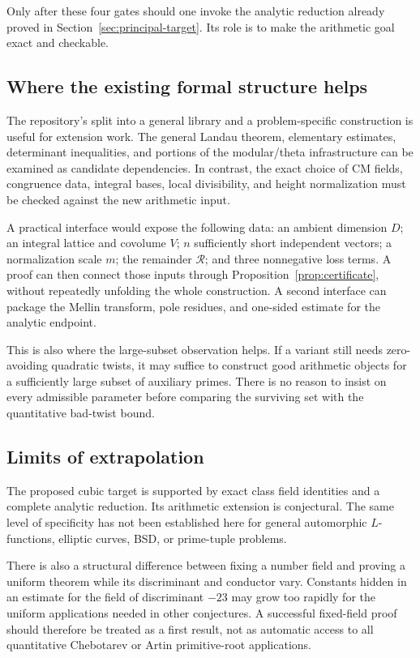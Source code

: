 Only after these four gates should one invoke the analytic reduction already proved in Section~\ref{sec:principal-target}. Its role is to make the arithmetic goal exact and checkable.

\subsection{Where the existing formal structure helps}

The repository's split into a general library and a problem-specific construction is useful for extension work. The general Landau theorem, elementary estimates, determinant inequalities, and portions of the modular/theta infrastructure can be examined as candidate dependencies. In contrast, the exact choice of CM fields, congruence data, integral bases, local divisibility, and height normalization must be checked against the new arithmetic input.

A practical interface would expose the following data: an ambient dimension \(D\); an integral lattice and covolume \(V\); \(n\) sufficiently short independent vectors; a normalization scale \(m\); the remainder \(\mathcal R\); and three nonnegative loss terms. A proof can then connect those inputs through Proposition~\ref{prop:certificate}, without repeatedly unfolding the whole construction. A second interface can package the Mellin transform, pole residues, and one-sided estimate for the analytic endpoint.

This is also where the large-subset observation helps. If a variant still needs zero-avoiding quadratic twists, it may suffice to construct good arithmetic objects for a sufficiently large subset of auxiliary primes. There is no reason to insist on every admissible parameter before comparing the surviving set with the quantitative bad-twist bound.

\subsection{Limits of extrapolation}

The proposed cubic target is supported by exact class field identities and a complete analytic reduction. Its arithmetic extension is conjectural. The same level of specificity has not been established here for general automorphic \(L\)-functions, elliptic curves, BSD, or prime-tuple problems.

There is also a structural difference between fixing a number field and proving a uniform theorem while its discriminant and conductor vary. Constants hidden in an estimate for the field of discriminant \(-23\) may grow too rapidly for the uniform applications needed in other conjectures. A successful fixed-field proof should therefore be treated as a first result, not as automatic access to all quantitative Chebotarev or Artin primitive-root applications.

